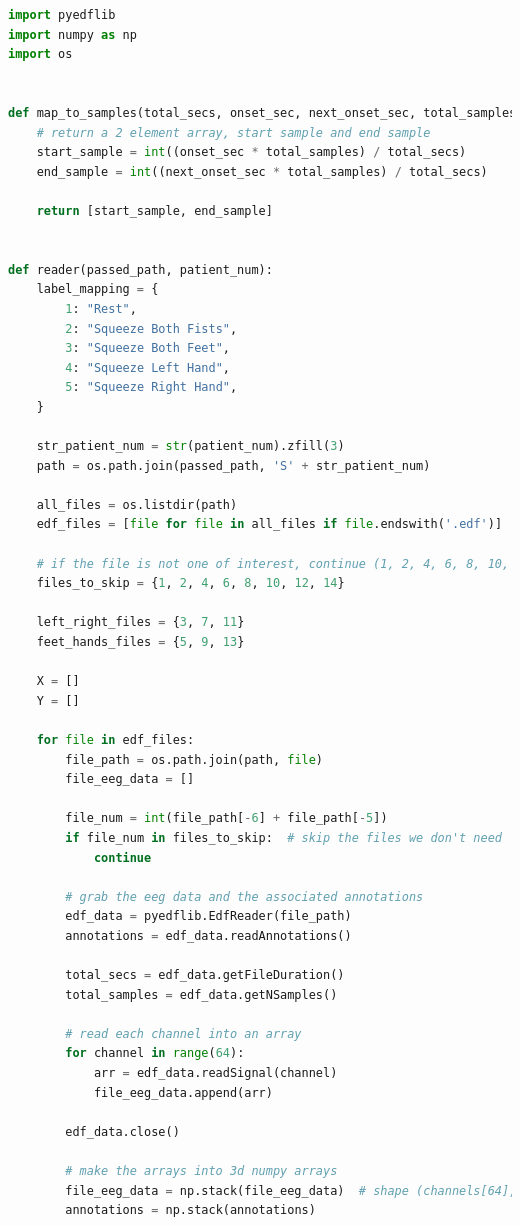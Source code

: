\documentclass[conference]{IEEEtran}
\begin{document}
    \begin{lstlisting}[language=Python, caption=Data Preprocessing Code, label=preprocessing_code]
    import pyedflib
import numpy as np
import os


def map_to_samples(total_secs, onset_sec, next_onset_sec, total_samples):
    # return a 2 element array, start sample and end sample
    start_sample = int((onset_sec * total_samples) / total_secs)
    end_sample = int((next_onset_sec * total_samples) / total_secs)

    return [start_sample, end_sample]


def reader(passed_path, patient_num):
    label_mapping = {
        1: "Rest",
        2: "Squeeze Both Fists",
        3: "Squeeze Both Feet",
        4: "Squeeze Left Hand",
        5: "Squeeze Right Hand",
    }

    str_patient_num = str(patient_num).zfill(3)
    path = os.path.join(passed_path, 'S' + str_patient_num)
    
    all_files = os.listdir(path)
    edf_files = [file for file in all_files if file.endswith('.edf')]

    # if the file is not one of interest, continue (1, 2, 4, 6, 8, 10, 12, 14)
    files_to_skip = {1, 2, 4, 6, 8, 10, 12, 14}

    left_right_files = {3, 7, 11}
    feet_hands_files = {5, 9, 13}

    X = []
    Y = []

    for file in edf_files:
        file_path = os.path.join(path, file)
        file_eeg_data = []

        file_num = int(file_path[-6] + file_path[-5])
        if file_num in files_to_skip:  # skip the files we don't need
            continue

        # grab the eeg data and the associated annotations
        edf_data = pyedflib.EdfReader(file_path)
        annotations = edf_data.readAnnotations()

        total_secs = edf_data.getFileDuration()
        total_samples = edf_data.getNSamples()

        # read each channel into an array
        for channel in range(64):
            arr = edf_data.readSignal(channel)
            file_eeg_data.append(arr)

        edf_data.close()

        # make the arrays into 3d numpy arrays
        file_eeg_data = np.stack(file_eeg_data)  # shape (channels[64], samples[2000])
        annotations = np.stack(annotations)


\end{lstlisting}
\end{document}
